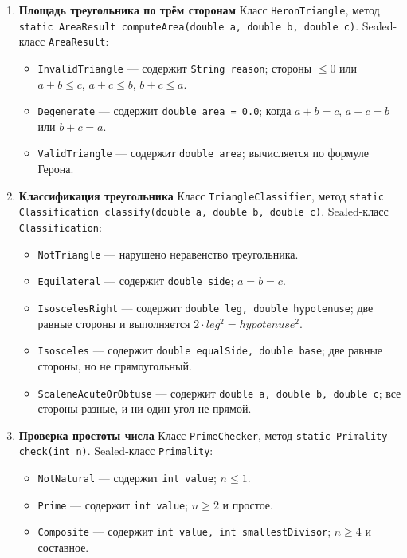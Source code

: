 \documentclass[12pt]{article}
\begin{document}
\begin{enumerate}
\item[4] \textbf{Площадь треугольника по трём сторонам}
Класс \texttt{HeronTriangle}, метод
\texttt{static AreaResult computeArea(double a, double b, double c)}.
Sealed-класс \texttt{AreaResult}:
\begin{itemize}
\item \texttt{InvalidTriangle} — содержит \texttt{String reason}; стороны \(\leq 0\) или \(a+b \leq c\), \(a+c \leq b\), \(b+c \leq a\).
\item \texttt{Degenerate} — содержит \texttt{double area = 0.0}; когда \(a + b = c\), \(a + c = b\) или \(b + c = a\).
\item \texttt{ValidTriangle} — содержит \texttt{double area}; вычисляется по формуле Герона.
\end{itemize}

\item[5] \textbf{Классификация треугольника}
Класс \texttt{TriangleClassifier}, метод
\texttt{static Classification classify(double a, double b, double c)}.
Sealed-класс \texttt{Classification}:
\begin{itemize}
\item \texttt{NotTriangle} — нарушено неравенство треугольника.
\item \texttt{Equilateral} — содержит \texttt{double side}; \(a = b = c\).
\item \texttt{IsoscelesRight} — содержит \texttt{double leg, double hypotenuse}; две равные стороны и выполняется \(2\cdot leg^2 = hypotenuse^2\).
\item \texttt{Isosceles} — содержит \texttt{double equalSide, double base}; две равные стороны, но не прямоугольный.
\item \texttt{ScaleneAcuteOrObtuse} — содержит \texttt{double a, double b, double c}; все стороны разные, и ни один угол не прямой.
\end{itemize}

\item[6] \textbf{Проверка простоты числа}
Класс \texttt{PrimeChecker}, метод
\texttt{static Primality check(int n)}.
Sealed-класс \texttt{Primality}:
\begin{itemize}
\item \texttt{NotNatural} — содержит \texttt{int value}; \(n \leq 1\).
\item \texttt{Prime} — содержит \texttt{int value}; \(n \geq 2\) и простое.
\item \texttt{Composite} — содержит \texttt{int value, int smallestDivisor}; \(n \geq 4\) и составное.
\end{itemize}


\end{enumerate}
\end{document}
